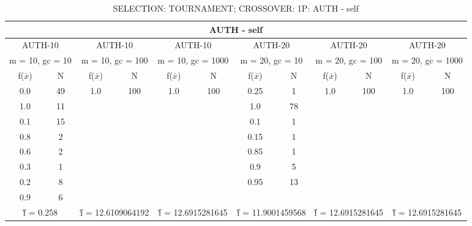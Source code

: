 \begin{table}[H]
	\centering
	\caption{SELECTION: TOURNAMENT; CROSSOVER: 1P: AUTH - self}
	\begin{adjustbox}{width=1\textwidth}
		\begin{tabular}{ |c|c||c|c||c|c||c|c||c|c||c|c| }
			\hline
			\multicolumn{12}{|c|}{AUTH - self} \\
			\hline
			\multicolumn{2}{|c||}{AUTH-10} & \multicolumn{2}{c||}{AUTH-10} & \multicolumn{2}{c||}{AUTH-10} & \multicolumn{2}{c||}{AUTH-20} & \multicolumn{2}{c||}{AUTH-20} & \multicolumn{2}{c|}{AUTH-20}\\
			\hline
			\multicolumn{2}{|c||}{m = 10, gc = 10} & \multicolumn{2}{c||}{m = 10, gc = 100} & \multicolumn{2}{c||}{m = 10, gc = 1000} & \multicolumn{2}{c||}{m = 20, gc = 10} & \multicolumn{2}{c||}{m = 20, gc = 100} & \multicolumn{2}{c|}{m = 20, gc = 1000}\\
			\hline
			f($\bar{x}$) & N & f($\bar{x}$) & N & f($\bar{x}$) & N & f($\bar{x}$) & N & f($\bar{x}$) & N & f($\bar{x}$) & N\\
			\hline
			\hline
			0.0 & 49 & 1.0 & 100 & 1.0 & 100 & 0.25 & 1 & 1.0 & 100 & 1.0 & 100\\
			1.0 & 11 &   &   &   &   & 1.0 & 78 &   &   &   &  \\
			0.1 & 15 &   &   &   &   & 0.1 & 1 &   &   &   &  \\
			0.8 & 2 &   &   &   &   & 0.15 & 1 &   &   &   &  \\
			0.6 & 2 &   &   &   &   & 0.85 & 1 &   &   &   &  \\
			0.3 & 1 &   &   &   &   & 0.9 & 5 &   &   &   &  \\
			0.2 & 8 &   &   &   &   & 0.95 & 13 &   &   &   &  \\
			0.9 & 6 &   &   &   &   &   &   &   &   &   &  \\
			\hline
			\multicolumn{2}{|c||}{\^{f} = 0.258} & \multicolumn{2}{c||}{\^{f} = 12.6109064192} & \multicolumn{2}{c||}{\^{f} = 12.6915281645} & \multicolumn{2}{c||}{\^{f} = 11.9001459568} & \multicolumn{2}{c||}{\^{f} = 12.6915281645} & \multicolumn{2}{c|}{\^{f} = 12.6915281645}\\
			\hline
		\end{tabular}
	\end{adjustbox}
\end{table}
